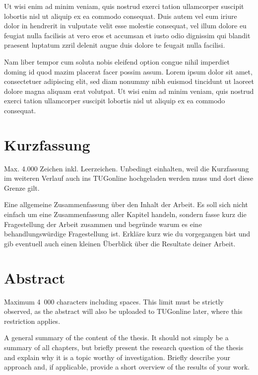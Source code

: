 \documentclass[a4paper, fleqn, headsepline, footsepline, 12pt, parskip=half]{scrartcl}
\begin{document}
Ut wisi enim ad minim veniam, quis nostrud exerci tation ullamcorper suscipit lobortis nisl ut aliquip ex ea commodo consequat. Duis autem vel eum iriure dolor in hendrerit in vulputate velit esse molestie consequat, vel illum dolore eu feugiat nulla facilisis at vero eros et accumsan et iusto odio dignissim qui blandit praesent luptatum zzril delenit augue duis dolore te feugait nulla facilisi.

Nam liber tempor cum soluta nobis eleifend option congue nihil imperdiet doming id quod mazim placerat facer possim assum. Lorem ipsum dolor sit amet, consectetuer adipiscing elit, sed diam nonummy nibh euismod tincidunt ut laoreet dolore magna aliquam erat volutpat. Ut wisi enim ad minim veniam, quis nostrud exerci tation ullamcorper suscipit lobortis nisl ut aliquip ex ea commodo consequat. 
\newpage

\section*{Kurzfassung} %

Max. 4.000 Zeichen inkl. Leerzeichen. Unbedingt einhalten, weil die Kurzfassung im weiteren Verlauf auch ins TUGonline hochgeladen werden muss und dort diese Grenze gilt.

Eine allgemeine Zusammenfassung über den Inhalt der Arbeit. Es soll sich nicht einfach um eine Zusammenfassung aller Kapitel handeln, sondern fasse kurz die Fragestellung der Arbeit zusammen und begründe warum es eine behandlungswürdige Fragestellung ist. Erkläre kurz wie du vorgegangen bist und gib eventuell auch einen kleinen Überblick über die Resultate deiner Arbeit.

\newpage

\section*{Abstract} %

Maximum 4~000 characters including spaces. This limit must be strictly observed, as the abstract will also be uploaded to TUGonline later, where this restriction applies.

A general summary of the content of the thesis. It should not simply be a summary of all chapters, but briefly present the research question of the thesis and explain why it is a topic worthy of investigation. Briefly describe your approach and, if applicable, provide a short overview of the results of your work.
\end{document}
